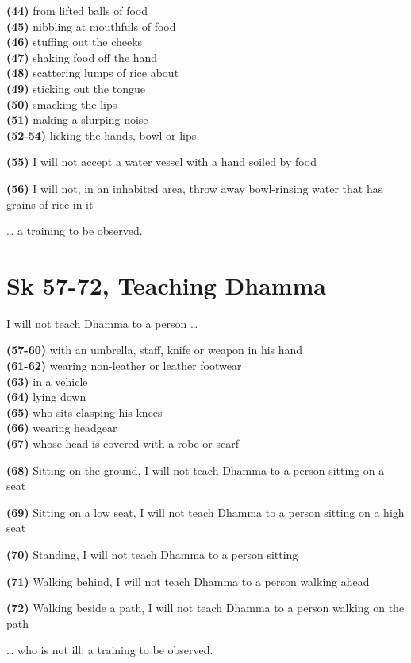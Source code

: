 \textbf{(44)} from lifted balls of food\\
\textbf{(45)} nibbling at mouthfuls of food\\
\textbf{(46)} stuffing out the cheeks\\
\textbf{(47)} shaking food off the hand\\
\textbf{(48)} scattering lumps of rice about\\
\textbf{(49)} sticking out the tongue\\
\textbf{(50)} smacking the lips\\
\textbf{(51)} making a slurping noise\\
\textbf{(52-54)} licking the hands, bowl or lips

\textbf{(55)} I will not accept a water vessel with a hand soiled by
food

\textbf{(56)} I will not, in an inhabited area, throw away bowl-rinsing
water that has grains of rice in it

\ldots{} a training to be observed.

\clearpage

\section{Sk 57-72, Teaching Dhamma}

I will not teach Dhamma to a person \ldots{}

\textbf{(57-60)} with an umbrella, staff, knife or weapon in his hand\\
\textbf{(61-62)} wearing non-leather or leather footwear\\
\textbf{(63)} in a vehicle\\
\textbf{(64)} lying down\\
\textbf{(65)} who sits clasping his knees\\
\textbf{(66)} wearing headgear\\
\textbf{(67)} whose head is covered with a robe or scarf

\textbf{(68)} Sitting on the ground, I will not teach Dhamma to a person
sitting on a seat

\textbf{(69)} Sitting on a low seat, I will not teach Dhamma to a person
sitting on a high seat

\textbf{(70)} Standing, I will not teach Dhamma to a person sitting

\textbf{(71)} Walking behind, I will not teach Dhamma to a person
walking ahead

\textbf{(72)} Walking beside a path, I will not teach Dhamma to a person
walking on the path

\ldots{} who is not ill: a training to be observed.

